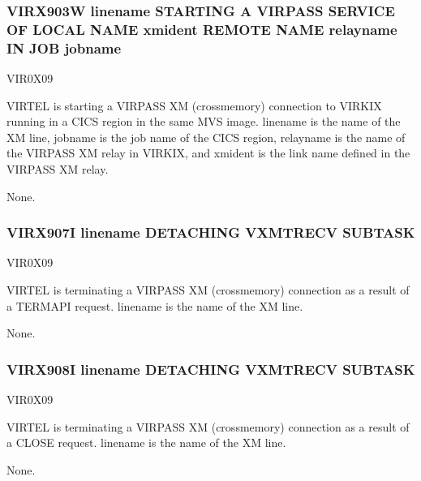\documentclass[letterpaper,10pt,english]{sphinxmanual}
\begin{document}
\subsubsection{VIRX903W linename STARTING A VIRPASS SERVICE OF LOCAL NAME xmident REMOTE NAME relayname IN JOB jobname}
\label{\detokenize{messages:virx903w-linename-starting-a-virpass-service-of-local-name-xmident-remote-name-relayname-in-job-jobname}}\begin{description}
\sphinxAtStartPar
VIR0X09

\sphinxAtStartPar
VIRTEL is starting a VIRPASS XM (cross\sphinxhyphen{}memory) connection to VIRKIX running in a CICS region in the same MVS image. linename is the name of the XM line, jobname is the job name of the CICS region, relayname is the name of the VIRPASS XM relay in VIRKIX, and xmident is the link name defined in the VIRPASS XM relay.

\sphinxAtStartPar
None.

\end{description}


\subsubsection{VIRX907I linename DETACHING VXMTRECV SUBTASK}
\label{\detokenize{messages:virx907i-linename-detaching-vxmtrecv-subtask}}\begin{description}
\sphinxAtStartPar
VIR0X09

\sphinxAtStartPar
VIRTEL is terminating a VIRPASS XM (cross\sphinxhyphen{}memory) connection as a result of a TERMAPI request. linename is the name of the XM line.

\sphinxAtStartPar
None.

\end{description}


\subsubsection{VIRX908I linename DETACHING VXMTRECV SUBTASK}
\label{\detokenize{messages:virx908i-linename-detaching-vxmtrecv-subtask}}\begin{description}
\sphinxAtStartPar
VIR0X09

\sphinxAtStartPar
VIRTEL is terminating a VIRPASS XM (cross\sphinxhyphen{}memory) connection as a result of a CLOSE request. linename is the name of the XM line.

\sphinxAtStartPar
None.

\end{description}
\end{document}

